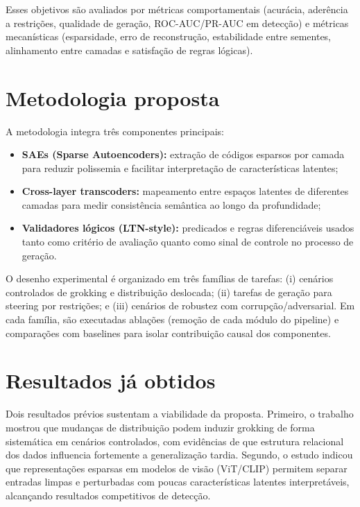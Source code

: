 Esses objetivos são avaliados por métricas comportamentais (acurácia, aderência a restrições, qualidade de geração, ROC-AUC/PR-AUC em detecção) e métricas mecanísticas (esparsidade, erro de reconstrução, estabilidade entre sementes, alinhamento entre camadas e satisfação de regras lógicas).

\section*{Metodologia proposta}
A metodologia integra três componentes principais:
\begin{itemize}
    \item \textbf{SAEs (Sparse Autoencoders):} extração de códigos esparsos por camada para reduzir polissemia e facilitar interpretação de características latentes;
    \item \textbf{Cross-layer transcoders:} mapeamento entre espaços latentes de diferentes camadas para medir consistência semântica ao longo da profundidade;
    \item \textbf{Validadores lógicos (LTN-style):} predicados e regras diferenciáveis usados tanto como critério de avaliação quanto como sinal de controle no processo de geração.
\end{itemize}

O desenho experimental é organizado em três famílias de tarefas: (i) cenários controlados de grokking e distribuição deslocada; (ii) tarefas de geração para steering por restrições; e (iii) cenários de robustez com corrupção/adversarial. Em cada família, são executadas ablações (remoção de cada módulo do pipeline) e comparações com baselines para isolar contribuição causal dos componentes.

\section*{Resultados já obtidos}
Dois resultados prévios sustentam a viabilidade da proposta. Primeiro, o trabalho \cite{carvalho2025inducing_grokking_distribution_shifts} mostrou que mudanças de distribuição podem induzir grokking de forma sistemática em cenários controlados, com evidências de que estrutura relacional dos dados influencia fortemente a generalização tardia. Segundo, o estudo \cite{carvalho2026interpretable_stego_detection_sae} indicou que representações esparsas em modelos de visão (ViT/CLIP) permitem separar entradas limpas e perturbadas com poucas características latentes interpretáveis, alcançando resultados competitivos de detecção.

